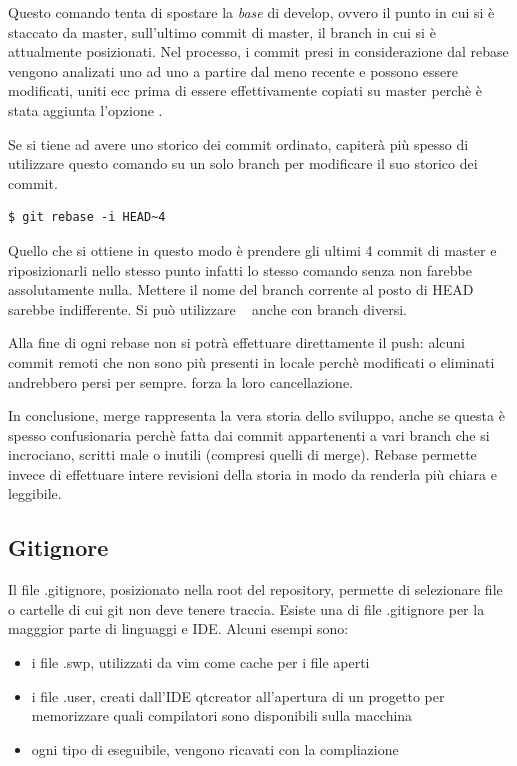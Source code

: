 \documentclass{article}
\begin{document}
Questo comando tenta di spostare la \emph{base} di develop, ovvero il punto in
cui si è staccato da master, sull'ultimo commit di master, il branch in cui si è
attualmente posizionati.
Nel processo, i commit presi in considerazione dal rebase vengono analizati uno
ad uno a partire dal meno recente e possono essere modificati, uniti ecc prima
di essere effettivamente copiati su master perchè è stata aggiunta l'opzione
.

Se si tiene ad avere uno storico dei commit ordinato, capiterà più spesso di
utilizzare questo comando su un solo branch per modificare il suo storico dei
commit.

\begin{verbatim}
$ git rebase -i HEAD~4
\end{verbatim}

Quello che si ottiene in questo modo è prendere gli ultimi 4 commit di master e
riposizionarli nello stesso punto infatti lo stesso comando senza  non
farebbe assolutamente nulla.
Mettere il nome del branch corrente al posto di HEAD sarebbe indifferente.
Si può utilizzare ~ anche con branch diversi.

Alla fine di ogni rebase non si potrà effettuare direttamente il push: alcuni
commit remoti che non sono più presenti in locale perchè modificati o eliminati
andrebbero persi per sempre.  forza la loro cancellazione.

In conclusione, merge rappresenta la vera storia dello sviluppo, anche se questa
è spesso confusionaria perchè fatta dai commit appartenenti a vari branch che si
incrociano, scritti male o inutili (compresi quelli di merge).
Rebase permette invece di effettuare intere revisioni della storia in modo da
renderla più chiara e leggibile.

\subsection{Gitignore}
Il file .gitignore, posizionato nella root del repository, permette di
selezionare file o cartelle di cui git non deve tenere traccia.
Esiste una 
di file .gitignore per la magggior parte di linguaggi e IDE. Alcuni esempi sono:
\begin{itemize}
    \item i file .swp, utilizzati da vim come cache per i file aperti
    \item i file .user, creati dall'IDE qtcreator all'apertura di un progetto per
        memorizzare quali compilatori sono disponibili sulla macchina
    \item ogni tipo di eseguibile, vengono ricavati con la compliazione
\end{itemize}
\end{document}
